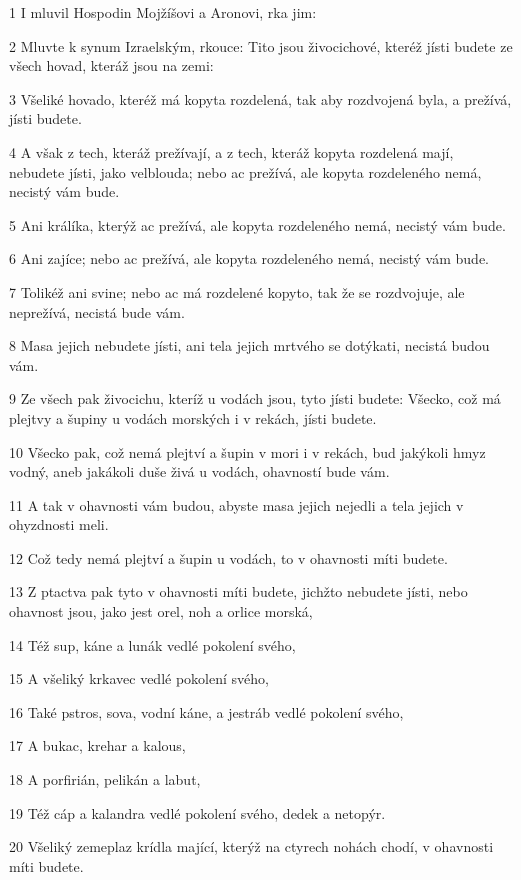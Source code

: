\par 1 I mluvil Hospodin Mojžíšovi a Aronovi, rka jim:
\par 2 Mluvte k synum Izraelským, rkouce: Tito jsou živocichové, kteréž jísti budete ze všech hovad, kteráž jsou na zemi:
\par 3 Všeliké hovado, kteréž má kopyta rozdelená, tak aby rozdvojená byla, a prežívá, jísti budete.
\par 4 A však z tech, kteráž prežívají, a z tech, kteráž kopyta rozdelená mají, nebudete jísti, jako velblouda; nebo ac prežívá, ale kopyta rozdeleného nemá, necistý vám bude.
\par 5 Ani králíka, kterýž ac prežívá, ale kopyta rozdeleného nemá, necistý vám bude.
\par 6 Ani zajíce; nebo ac prežívá, ale kopyta rozdeleného nemá, necistý vám bude.
\par 7 Tolikéž ani svine; nebo ac má rozdelené kopyto, tak že se rozdvojuje, ale neprežívá, necistá bude vám.
\par 8 Masa jejich nebudete jísti, ani tela jejich mrtvého se dotýkati, necistá budou vám.
\par 9 Ze všech pak živocichu, kteríž u vodách jsou, tyto jísti budete: Všecko, což má plejtvy a šupiny u vodách morských i v rekách, jísti budete.
\par 10 Všecko pak, což nemá plejtví a šupin v mori i v rekách, bud jakýkoli hmyz vodný, aneb jakákoli duše živá u vodách, ohavností bude vám.
\par 11 A tak v ohavnosti vám budou, abyste masa jejich nejedli a tela jejich v ohyzdnosti meli.
\par 12 Což tedy nemá plejtví a šupin u vodách, to v ohavnosti míti budete.
\par 13 Z ptactva pak tyto v ohavnosti míti budete, jichžto nebudete jísti, nebo ohavnost jsou, jako jest orel, noh a orlice morská,
\par 14 Též sup, káne a lunák vedlé pokolení svého,
\par 15 A všeliký krkavec vedlé pokolení svého,
\par 16 Také pstros, sova, vodní káne, a jestráb vedlé pokolení svého,
\par 17 A bukac, krehar a kalous,
\par 18 A porfirián, pelikán a labut,
\par 19 Též cáp a kalandra vedlé pokolení svého, dedek a netopýr.
\par 20 Všeliký zemeplaz krídla mající, kterýž na ctyrech nohách chodí, v ohavnosti míti budete.
